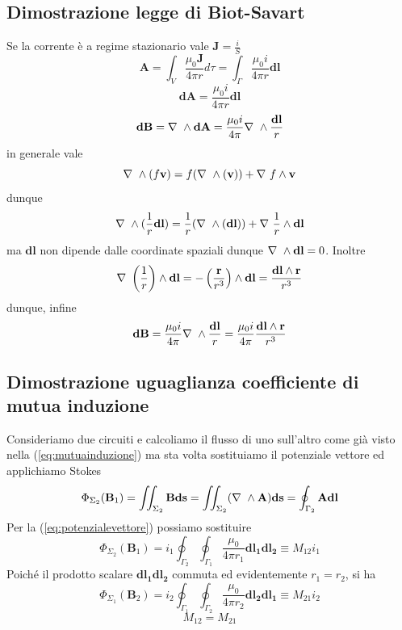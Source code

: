 \documentclass[
10pt, %
a4paper, %
oneside, %
headinclude,footinclude, %
BCOR5mm, %
]{scrartcl}
\begin{document}
\subsection{Dimostrazione legge di Biot-Savart}
Se la corrente è a regime stazionario vale \(\mathbf{J} = \frac{i}{S}\)
\[\mathbf{A} = \int_V \frac{\mu_0 \mathbf{J}}{4\pi r}d\tau = \int_{\Gamma}\frac{\mu_0 i}{4\pi r}\mathbf{dl}\]
\[\mathbf{dA} = \frac{\mu_0 i}{4\pi r}\mathbf{dl}\]
\[\mathbf{dB} = \nabla\ \wedge\mathbf{dA} = \frac{\mu_0 i}{4\pi}\nabla\ \wedge\frac{\mathbf{dl}}{r}\]
in generale vale
\[\nabla\ \wedge(f \mathbf{v}) = f(\nabla\ \wedge(\mathbf{v}))+\nabla\  f \wedge\mathbf{v}\]
dunque
\[\nabla\ \wedge(\frac{1}{r} \mathbf{dl}) = \frac{1}{r}(\nabla\ \wedge(\mathbf{dl}))+\nabla\  \frac{1}{r} \wedge\mathbf{dl}\]
ma \(\mathbf{dl}\) non dipende dalle coordinate spaziali dunque \(\nabla\ \wedge\mathbf{dl} = 0\). Inoltre
\[\nabla\ \left(\frac{1}{r}\right)\wedge\mathbf{dl} = -\left(\frac{\mathbf{r}}{r^3}\right)\wedge\mathbf{dl} = \frac{\mathbf{dl}\wedge\mathbf{r}}{r^3}\]
dunque, infine
\[\mathbf{dB} = \frac{\mu_0 i}{4\pi}\nabla\ \wedge\frac{\mathbf{dl}}{r}= \frac{\mu_0 i}{4\pi}\frac{\mathbf{dl}\wedge\mathbf{r}}{r^3}\]
\subsection{Dimostrazione uguaglianza coefficiente di mutua induzione}
Consideriamo due circuiti e calcoliamo il flusso di uno sull'altro come già visto nella (\ref{eq:mutuainduzione}) ma sta volta sostituiamo il potenziale vettore ed applichiamo Stokes
\[\Phi_{\Sigma_2}(\mathbf{B}_1) = \iint_{\Sigma_2}\mathbf{B}\mathbf{ds} =  \iint_{\Sigma_2}(\nabla\ \wedge\mathbf{A})\mathbf{ds} = \oint_{\Gamma_2}\mathbf{A}\mathbf{dl}\]
Per la (\ref{eq:potenzialevettore}) possiamo sostituire
\[\Phi_{\Sigma_2}(\mathbf{B}_1) = i_1\oint_{\Gamma_2}\oint_{\Gamma_1}\frac{\mu_0 }{4\pi r_1}\mathbf{dl_1}\mathbf{dl_2}\equiv M_{12} i_1\]
Poiché il prodotto scalare \(\mathbf{dl_1}\mathbf{dl_2}\) commuta ed evidentemente \(r_1 = r_2\), si ha 
\[\Phi_{\Sigma_1}(\mathbf{B}_2) = i_2\oint_{\Gamma_1}\oint_{\Gamma_2}\frac{\mu_0 }{4\pi r_2}\mathbf{dl_2}\mathbf{dl_1}\equiv M_{21} i_2\]
\[M_{12} = M_{21}\]
\end{document}

